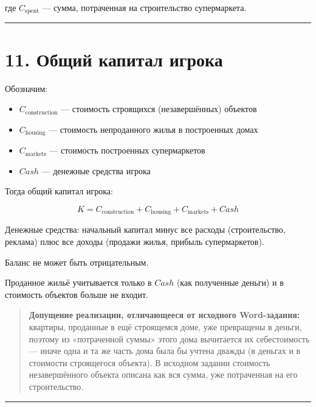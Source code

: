 \documentclass[
]{article}
\providecommand{\tightlist}{%
  \setlength{\itemsep}{0pt}\setlength{\parskip}{0pt}}
\begin{document}
где \(C_{\text{spent}}\) --- сумма, потраченная на строительство
супермаркета.

\begin{center}\rule{0.5\linewidth}{0.5pt}\end{center}

\section{11. Общий капитал
игрока}\label{ux43eux431ux449ux438ux439-ux43aux430ux43fux438ux442ux430ux43b-ux438ux433ux440ux43eux43aux430}

Обозначим:

\begin{itemize}
\tightlist
\item
  \(C_{\text{construction}}\) --- стоимость строящихся (незавершённых)
  объектов
\item
  \(C_{\text{housing}}\) --- стоимость непроданного жилья в построенных
  домах
\item
  \(C_{\text{markets}}\) --- стоимость построенных супермаркетов
\item
  \(Cash\) --- денежные средства игрока
\end{itemize}

Тогда общий капитал игрока:

\[
K
=
C_{\text{construction}}
+
C_{\text{housing}}
+
C_{\text{markets}}
+
Cash
\]

Денежные средства: начальный капитал минус все расходы (строительство,
реклама) плюс все доходы (продажи жилья, прибыль супермаркетов).

Баланс не может быть отрицательным.

Проданное жильё учитывается только в \(Cash\) (как полученные деньги) и
в стоимость объектов больше не входит.

\begin{quote}
\textbf{Допущение реализации, отличающееся от исходного Word-задания:}
квартиры, проданные в ещё строящемся доме, уже превращены в деньги, поэтому
из «потраченной суммы» этого дома вычитается их себестоимость --- иначе одна
и та же часть дома была бы учтена дважды (в деньгах и в стоимости
строящегося объекта). В исходном задании стоимость незавершённого объекта
описана как вся сумма, уже потраченная на его строительство.
\end{quote}

\begin{center}\rule{0.5\linewidth}{0.5pt}\end{center}
\end{document}
